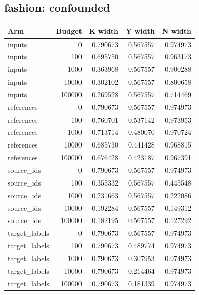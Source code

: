 \reservetable
\subsection{fashion: confounded}

\begingroup\small
\setlength{\tabcolsep}{4pt}
\begin{longtable}{lrrrr}
\toprule

Arm & Budget & K width & Y width & N width\\\midrule\endhead

inputs & 0 & 0.790673 & 0.567557 & 0.974973\\

inputs & 100 & 0.695750 & 0.567557 & 0.963173\\

inputs & 1000 & 0.363968 & 0.567557 & 0.900288\\

inputs & 10000 & 0.302102 & 0.567557 & 0.800658\\

inputs & 100000 & 0.269528 & 0.567557 & 0.714469\\

references & 0 & 0.790673 & 0.567557 & 0.974973\\

references & 100 & 0.760701 & 0.537142 & 0.973953\\

references & 1000 & 0.713714 & 0.480070 & 0.970724\\

references & 10000 & 0.685730 & 0.441428 & 0.968815\\

references & 100000 & 0.676428 & 0.423187 & 0.967391\\

source\_ids & 0 & 0.790673 & 0.567557 & 0.974973\\

source\_ids & 100 & 0.355332 & 0.567557 & 0.445548\\

source\_ids & 1000 & 0.231663 & 0.567557 & 0.222086\\

source\_ids & 10000 & 0.192284 & 0.567557 & 0.149312\\

source\_ids & 100000 & 0.182195 & 0.567557 & 0.127292\\

target\_labels & 0 & 0.790673 & 0.567557 & 0.974973\\

target\_labels & 100 & 0.790673 & 0.489774 & 0.974973\\

target\_labels & 1000 & 0.790673 & 0.307953 & 0.974973\\

target\_labels & 10000 & 0.790673 & 0.214464 & 0.974973\\

target\_labels & 100000 & 0.790673 & 0.181339 & 0.974973\\

\bottomrule
\end{longtable}
\endgroup

